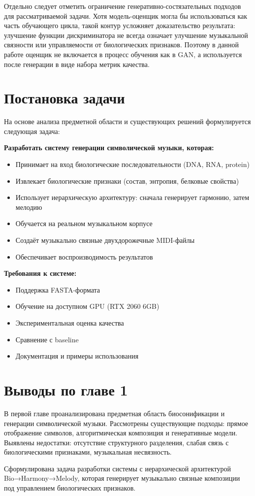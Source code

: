 Отдельно следует отметить ограничение генеративно-состязательных подходов для рассматриваемой задачи. Хотя модель-оценщик могла бы использоваться как часть обучающего цикла, такой контур усложняет доказательство результата: улучшение функции дискриминатора не всегда означает улучшение музыкальной связности или управляемости от биологических признаков. Поэтому в данной работе оценщик не включается в процесс обучения как в GAN, а используется после генерации в виде набора метрик качества.

\section{Постановка задачи}

На основе анализа предметной области и существующих решений формулируется следующая задача:

\textbf{Разработать систему генерации символической музыки, которая:}
\begin{itemize}
\item Принимает на вход биологические последовательности (DNA, RNA, protein)
\item Извлекает биологические признаки (состав, энтропия, белковые свойства)
\item Использует иерархическую архитектуру: сначала генерирует гармонию, затем мелодию
\item Обучается на реальном музыкальном корпусе
\item Создаёт музыкально связные двухдорожечные MIDI-файлы
\item Обеспечивает воспроизводимость результатов
\end{itemize}

\textbf{Требования к системе:}
\begin{itemize}
\item Поддержка FASTA-формата
\item Обучение на доступном GPU (RTX 2060 6GB)
\item Экспериментальная оценка качества
\item Сравнение с baseline
\item Документация и примеры использования
\end{itemize}

\section*{Выводы по главе 1}

В первой главе проанализирована предметная область биосонификации и генерации символической музыки. Рассмотрены существующие подходы: прямое отображение символов, алгоритмическая композиция и генеративные модели. Выявлены недостатки: отсутствие структурного разделения, слабая связь с биологическими признаками, музыкальная несвязность.

Сформулирована задача разработки системы с иерархической архитектурой Bio→Harmony→Melody, которая генерирует музыкально связные композиции под управлением биологических признаков.
